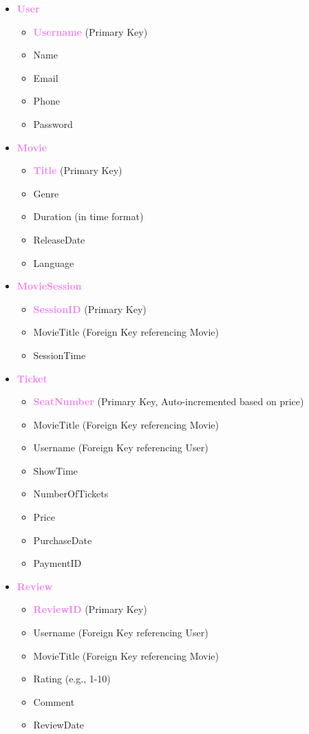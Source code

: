 \documentclass[a4paper,12pt]{article}  %
\renewcommand{\textbf}[1]{\textcolor{violet}{\bfseries #1}}
\begin{document}
\begin{itemize}
    \item \textbf{User}
    \begin{itemize}
        \item \textbf{Username} (Primary Key)
        \item Name
        \item Email
        \item Phone
        \item Password
    \end{itemize}

    \item \textbf{Movie}
    \begin{itemize}
        \item \textbf{Title} (Primary Key)
        \item Genre
        \item Duration (in time format)
        \item ReleaseDate
        \item Language
    \end{itemize}

    \item \textbf{MovieSession}
    \begin{itemize}
        \item \textbf{SessionID} (Primary Key)
        \item MovieTitle (Foreign Key referencing Movie)
        \item SessionTime
    \end{itemize}

    \item \textbf{Ticket}
    \begin{itemize}
        \item \textbf{SeatNumber} (Primary Key, Auto-incremented based on price)
        \item MovieTitle (Foreign Key referencing Movie)
        \item Username (Foreign Key referencing User)
        \item ShowTime
        \item NumberOfTickets
        \item Price
        \item PurchaseDate
        \item PaymentID
    \end{itemize}

    \item \textbf{Review}
    \begin{itemize}
        \item \textbf{ReviewID} (Primary Key)
        \item Username (Foreign Key referencing User)
        \item MovieTitle (Foreign Key referencing Movie)
        \item Rating (e.g., 1-10)
        \item Comment
        \item ReviewDate
    \end{itemize}
\end{itemize}
\end{document}
